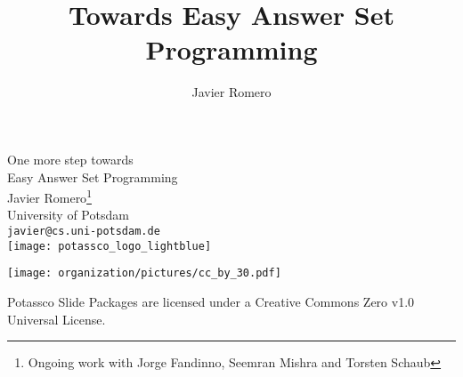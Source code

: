 \title{Towards Easy Answer Set Programming}
\author{Javier Romero}
\begin{frame}[c]
  \bigskip
  \vfill
  \begin{center}%
    \alert{\huge One more step towards}
    \\
    \bigskip
    \alert{\huge Easy Answer Set Programming}
    \\
    \bigskip
    \bigskip
    Javier Romero\footnote{%
    Ongoing work with Jorge Fandinno, Seemran Mishra and Torsten Schaub}\\
    University of Potsdam\\
    \texttt{javier@cs.uni-potsdam.de}\\
    \bigskip
    \texttt{[image: potassco\_logo\_lightblue]}
  \end{center}
  \bigskip
  \begin{center}
    \texttt{[image: organization/pictures/cc\_by\_30.pdf]} %
    \par
    {\tiny Potassco Slide Packages are licensed under a Creative Commons Zero v1.0 Universal License.}
  \end{center}
\end{frame}
%
